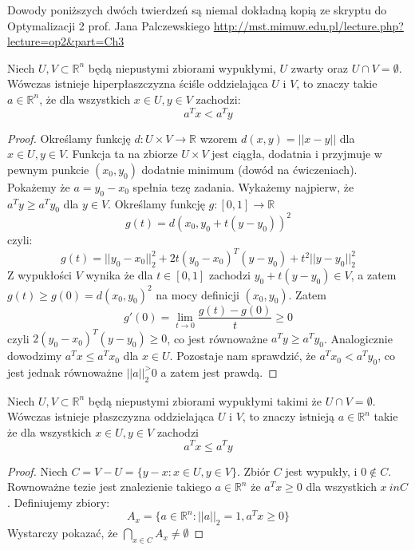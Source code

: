 \documentclass[10pt,a4paper,draft]{report}
\begin{document}
Dowody poniższych dwóch twierdzeń są niemal dokładną kopią ze skryptu do Optymalizacji 2 prof. Jana Palczewskiego \url{http://mst.mimuw.edu.pl/lecture.php?lecture=op2&part=Ch3}

\begin{theorem}
Niech $U,V \subset \mathbb{R}^n$ będą niepustymi zbiorami wypukłymi, $U$ zwarty oraz $U \cap V = \emptyset$. Wówczas istnieje hiperpłaszczyzna ściśle oddzielająca $U$ i $V$, to znaczy takie $a \in \mathbb{R}^n$, że dla wszystkich $x \in U, y \in V$ zachodzi:
\[
a^T x < a^T y
\]
\end{theorem}
\begin{proof}
Określamy funkcję $d: U \times V \rightarrow \mathbb{R}$ wzorem $d(x,y) = ||x-y||$ dla $x \in U, y \in V$. Funkcja ta na zbiorze $U \times V$ jest ciągła, dodatnia i przyjmuje w pewnym punkcie $(x_0, y_0)$ dodatnie minimum (dowód na ćwiczeniach). Pokażemy że  $a = y_0 - x_0$ spełnia tezę zadania. Wykażemy najpierw, że $a^T y \geq a^T y_0$ dla $y \in V$. Określamy funkcję $g: [0,1] \rightarrow \mathbb{R}$
\[
g(t) = d(x_0, y_0 + t(y-y_0))^2
\]
czyli:
\[
g(t) = ||y_0 - x_0||_2^2 + 2t (y_0 - x_0)^T (y - y_0) + t^2 ||y-y_0||_2^2
\]
Z wypukłości $V$ wynika że dla $t \in [0,1]$ zachodzi $y_0 + t(y - y_0) \in V$, a zatem $g(t) \geq g(0) = d(x_0, y_0)^2$ na mocy definicji $(x_0, y_0)$. Zatem 
\[
g'(0) = \lim_{t \rightarrow 0} \frac{g(t) - g(0)}{t} \geq 0
\]
czyli $2(y_0 - x_0)^T (y - y_0) \geq 0$, co jest równoważne $a^T y \geq a^T y_0$. Analogicznie dowodzimy $a^T x \leq a^T x_0$ dla $x \in U$. Pozostaje nam sprawdzić, że $a^T x_0 < a^T y_0$, co jest jednak równoważne $||a||_2^ > 0$ a zatem jest prawdą.
\end{proof}

\begin{theorem}
Niech $U,V \subset \mathbb{R}^n$ będą niepustymi zbiorami  wypukłymi takimi że $U \cap V = \emptyset$. Wówczas istnieje płaszczyzna oddzielająca $U$ i $V$, to znaczy istnieją $a \in \mathbb{R}^n$ takie że dla wszystkich $x \in U, y \in V$ zachodzi
\[
a^T x \leq a^T y
\]
\end{theorem}
\begin{proof}
Niech $C = V - U = \{ y - x: x \in U, y \in V \}$. Zbiór $C$ jest wypukły, i $0 \not\in C$. Rownoważne tezie jest znalezienie takiego $a \in \mathbb{R}^n$ że $a^T x \geq 0$ dla wszystkich $x \ in C$. Definiujemy zbiory:
\[
A_x = \{a \in \mathbb{R}^n : ||a||_2 = 1 , a^T x \geq 0 \}
\]
Wystarczy pokazać, że $\bigcap_{x \in C} A_x \neq \emptyset$
\end{proof}
\end{document}
